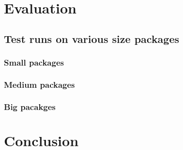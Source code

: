 
\chapter{Evaluation}

\begin{chapterabstract}
\end{chapterabstract}

\section{Test runs on various size packages}


\subsection{Small packages}


\subsection{Medium packages}


\subsection{Big pacakges}


\chapter{Conclusion}

\begin{chapterabstract}
\end{chapterabstract}


